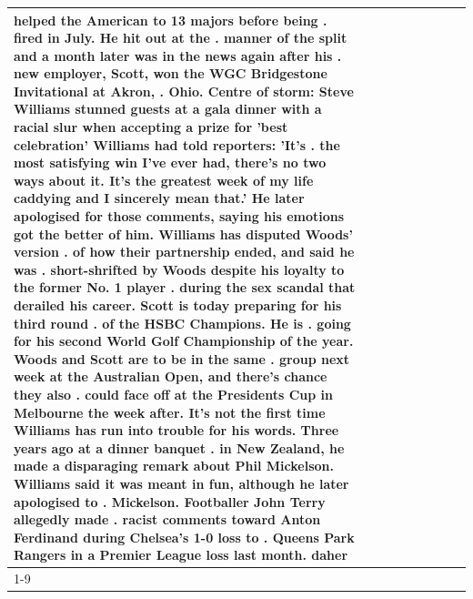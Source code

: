 \begin{table}[H]
\begin{tabular}{lllrlllll}
helped the American to 13 majors before being . fired in July. He hit out at the . manner of the split and a month later was in the news again after his . new employer, Scott, won the WGC Bridgestone Invitational at Akron, . Ohio. Centre of storm: Steve Williams stunned guests at a gala dinner with a racial slur when accepting a prize for 'best celebration' Williams had told reporters: 'It's . the most satisfying win I've ever had, there's no two ways about it. It's the greatest week of my life caddying and I sincerely mean that.' He later apologised for those comments, saying his emotions got the better of him. Williams has disputed Woods' version . of how their partnership ended, and said he was . short-shrifted by Woods despite his loyalty to the former No. 1 player . during the sex scandal that derailed his career. Scott is today preparing for his third round . of the HSBC Champions. He is . going for his second World Golf Championship of the year. Woods and Scott are to be in the same . group next week at the Australian Open, and there's chance they also . could face off at the Presidents Cup in Melbourne the week after. It's not the first time Williams has run into trouble for his words. Three years ago at a dinner banquet . in New Zealand, he made a disparaging remark about Phil Mickelson. Williams said it was meant in fun, although he later apologised to . Mickelson. Footballer John Terry allegedly made . racist comments toward Anton Ferdinand during Chelsea's 1-0 loss to . Queens Park Rangers in a Premier League loss last month. daher \\
\cline{1-9}

\end{tabular}
\end{table}
